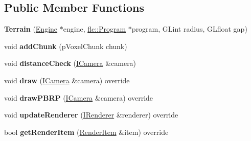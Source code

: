 \subsection*{Public Member Functions}
\begin{DoxyCompactItemize}
\item 
{\bfseries Terrain} (\hyperlink{classflw_1_1Engine}{Engine} $\ast$engine, \hyperlink{classflw_1_1flc_1_1Program}{flc\+::\+Program} $\ast$program, G\+Lint radius, G\+Lfloat gap)\hypertarget{classflw_1_1flf_1_1Terrain_a320fed070586b7554bd65ce73d871abb}{}\label{classflw_1_1flf_1_1Terrain_a320fed070586b7554bd65ce73d871abb}

\item 
void {\bfseries add\+Chunk} (p\+Voxel\+Chunk chunk)\hypertarget{classflw_1_1flf_1_1Terrain_ad22486020cfa8b20f38294967df5ecc3}{}\label{classflw_1_1flf_1_1Terrain_ad22486020cfa8b20f38294967df5ecc3}

\item 
void {\bfseries distance\+Check} (\hyperlink{classflw_1_1flf_1_1ICamera}{I\+Camera} \&camera)\hypertarget{classflw_1_1flf_1_1Terrain_a3b03ccdfdf93ad1573764f4513f2b5e8}{}\label{classflw_1_1flf_1_1Terrain_a3b03ccdfdf93ad1573764f4513f2b5e8}

\item 
void {\bfseries draw} (\hyperlink{classflw_1_1flf_1_1ICamera}{I\+Camera} \&camera) override\hypertarget{classflw_1_1flf_1_1Terrain_a4d6fcc4d73732ed6ba19c2ac532c6d96}{}\label{classflw_1_1flf_1_1Terrain_a4d6fcc4d73732ed6ba19c2ac532c6d96}

\item 
void {\bfseries draw\+P\+B\+RP} (\hyperlink{classflw_1_1flf_1_1ICamera}{I\+Camera} \&camera) override\hypertarget{classflw_1_1flf_1_1Terrain_a7dcfe6d21a4fd149ccba0d02291b64b4}{}\label{classflw_1_1flf_1_1Terrain_a7dcfe6d21a4fd149ccba0d02291b64b4}

\item 
void {\bfseries update\+Renderer} (\hyperlink{classflw_1_1flf_1_1IRenderer}{I\+Renderer} \&renderer) override\hypertarget{classflw_1_1flf_1_1Terrain_a77b1d31a8a673018266a4c324f629a02}{}\label{classflw_1_1flf_1_1Terrain_a77b1d31a8a673018266a4c324f629a02}

\item 
bool {\bfseries get\+Render\+Item} (\hyperlink{structflw_1_1flf_1_1RenderItem}{Render\+Item} \&item) override\hypertarget{classflw_1_1flf_1_1Terrain_a8fbfe9d71054538cc143c2c8966b3f0b}{}\label{classflw_1_1flf_1_1Terrain_a8fbfe9d71054538cc143c2c8966b3f0b}

\end{DoxyCompactItemize}
